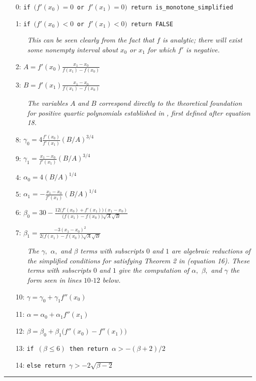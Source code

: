 \documentclass{article}
\begin{document}
\begin{itemize}
  \itemsep0pt
  \parskip0pt

\item[0:] \texttt{if $\big(f'(x_0) = 0$ or $f'(x_1) = 0\big)$ return is\_monotone\_simplified}
\item[1:] \texttt{if $\big(f'(x_0) < 0$ or $f'(x_1) < 0\big)$ return FALSE}
  \begin{itemize}
    \item[] \textit{This can be seen clearly from the fact that $f$ is analytic; there will exist some nonempty interval about $x_0$ or $x_1$ for which $f'$ is negative.}
  \end{itemize}

\item[2:] $A = f'(x_0)\frac{x_1 - x_0}{f(x_1) - f(x_0)}$
\item[3:] $B = f'(x_1) \frac{x_1 - x_0}{f(x_1) - f(x_0)}$
  \begin{itemize}
    \item[] \textit{The variables $A$ and $B$ correspond directly to the theoretical foundation for positive quartic polynomials established in \cite{ulrich1994positivity}, first defined after equation 18.}
  \end{itemize}
\item[8:] $\gamma_0 = 4 \frac{f'(x_0)}{f'(x_1)} (B/A)^{3/4}$
\item[9:] $\gamma_1 = \frac{x_1 - x_0}{f'(x_1)} (B/A)^{3/4}$
\item[4:] $\alpha_0 = 4 (B/A)^{1/4}$
\item[5:] $\alpha_1 = -\frac{x_1 - x_0}{f'(x_1)} (B/A)^{1/4}$
\item[6:] $\beta_0 = 30 - \frac{12 \big(f'(x_0) + f'(x_1)\big) (x_1 - x_0)}{\big(f(x_1) - f(x_0)\big) \sqrt{A}\sqrt{B}}$
\item[7:] $\beta_1 = \frac{-3 (x_1 - x_0)^2}{2 \big(f(x_1) - f(x_0)\big) \sqrt{A} \sqrt{B}} $
  \begin{itemize}
    \item[] \textit{The $\gamma,$ $\alpha,$ and $\beta$ terms with subscripts $0$ and $1$ are algebraic reductions of the simplified conditions for satisfying Theorem 2 in \cite{ulrich1994positivity} (equation 16). These terms with subscripts $0$ and $1$ give the computation of $\alpha,$ $\beta,$ and $\gamma$ the form seen in lines $10$-$12$ below.}
  \end{itemize}
\item[10:] $\gamma = \gamma_0 + \gamma_1 f''(x_0)$
\item[11:] $\alpha = \alpha_0 + \alpha_1 f''(x_1)$
\item[12:] $\beta = \beta_0 + \beta_1 \big(f''(x_0) - f''(x_1)\big)$
\item[13:] \texttt{if $(\beta \leq 6)$ then return $\alpha > - (\beta + 2) / 2$}
\item[14:] \texttt{else return $\gamma > -2 \sqrt{\beta - 2}$ }

\end{itemize}
\hrule
\vspace{10pt}
\end{document}
